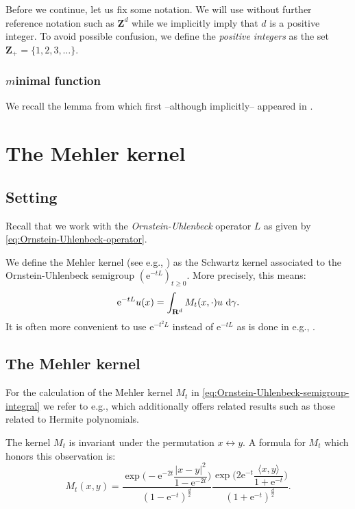 \documentclass[a4paper,oneside,10pt]{amsproc}
\theoremstyle{plain}
\theoremstyle{remark}
\newcommand{\D}{\,\textup{d}}
\newcommand{\la}{\langle}
\newcommand{\ra}{\rangle}
\renewcommand{\geq}{\geqslant}
\newcommand{\R}{\mathbf R}
\newcommand{\Z}{\mathbf Z}
\newcommand{\e}{\mathrm{e}} %
\renewcommand{\geq}{\geqslant}%
\begin{document}
Before we continue, let us fix some notation. We will use without
further reference notation such as $\Z^d$ while we implicitly imply
that $d$ is a positive integer. To avoid possible confusion, we define
the \emph{positive integers} as the set $\Z_+ = \{1, 2, 3, \dots\}$. 

%
%
%

\subsubsection{$m$inimal function}
We recall the lemma from \cite[lemma 2.3]{Maas2011b} which first
--although implicitly-- appeared in \cite{Mauceri2007}.

\section{The Mehler kernel}
\subsection{Setting}
Recall that we work with the \emph{Ornstein-Uhlenbeck} operator $L$ as
given by \eqref{eq:Ornstein-Uhlenbeck-operator}.

We define the Mehler kernel (see e.g., \textcite{Sjogren1997}) as the
Schwartz kernel associated to the Ornstein-Uhlenbeck semigroup
$(\e^{-tL})_{t \geq 0}$. More precisely, this means:
\begin{equation}
  \label{eq:Ornstein-Uhlenbeck-semigroup-integral}
  \e^{-tL} u(x) = \int_{\R^d} M_t(x, \cdot) u \, \D\gamma.
\end{equation}
It is often more convenient to use $\e^{-t^2 L}$ instead of $\e^{-tL}$
as is done in e.g., \textcite{Portal2012}.

\subsection{The Mehler kernel}
For the calculation of the Mehler kernel $M_t$ in
\eqref{eq:Ornstein-Uhlenbeck-semigroup-integral} we refer to e.g.,
\textcite{Sjogren1997} which additionally offers related results such
as those related to Hermite polynomials.

The kernel $M_t$ is invariant under the permutation $x
\leftrightarrow y$. A formula for $M_t$ which honors this
observation is:
\begin{equation}
  \label{eq:Mehler-kernel}
  M_t(x, y) = \frac{\exp\biggl(-\e^{-2t} \dfrac{|x - y|^2}{1
      - \e^{-2 t}}  \biggr)}{(1 - \e^{-t})^{\frac{d}2}}
  \frac{\exp\biggl(2\e^{-t} \dfrac{\la x, y \ra}{1 + \e^{-t}}
    \biggr)}{(1 + \e^{-t})^{\frac{d}2}}.
\end{equation}
\end{document}
